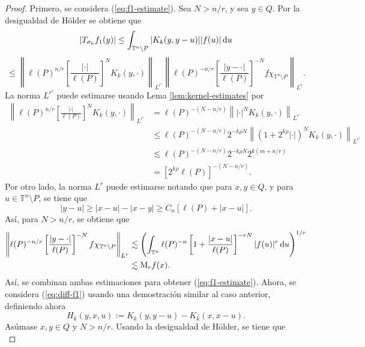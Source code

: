 \begin{proof}
	Primero, se considera (\ref{eq:f1-estimate}). Sea $N>n/r$, y sea $y\in Q$. Por la desigualdad de H\"older se obtiene que
	\begin{equation*}
		|T_{\sigma_k}f_1(y)| \leq \int_{\mathbb{T}^n\setminus P} |K_k(y, y-u)||f(u)|\mathop{}\!\mathrm{d} u 
	\end{equation*}
	\begin{equation*}
		\leq \left\| \ell(P)^{n/r} \left[ \frac{|\cdot|}{\ell(P)} \right]^N K_k(y, \cdot) 
		\right\|_{L^{r'}} \left\| \ell(P)^{-n/r} \left[ \frac{|y-\cdot|}{\ell(P)} \right]^{-N} f\chi_{\mathbb{T}^n\setminus P} 
		\right\|_{L^r}.
	\end{equation*}
	La norma $L^{r'}$ puede estimarse usando Lema \ref{lem:kernel-estimates} por 
	\begin{align*}
		\left\| \ell(P)^{n/r} \left[ \frac{|\cdot|}{\ell(P)} \right]^N K_k(y, \cdot) 
		\right\|_{L^{r'}} & = \ell(P)^{-(N-n/r)} \left\| |\cdot|^N K_k(y, \cdot)  \right\|_{L^{r'}} \\
		& \leq \ell(P)^{-(N-n/r)} 2^{-k\rho N} \left\| (1+2^{k\rho} |\cdot|)^N K_k(y, \cdot)  \right\|_{L^{r'}} \\
		& \lesssim \ell(P)^{-(N-n/r)} 2^{-k\rho N} 2^{k(m+n/r)}\\
		& = [2^{k\rho}\ell(P)]^{-(N-n/r)}.
	\end{align*}
	Por otro lado, la norma $L^r$ puede estimarse notando que para $x, y \in Q$, y para $u \in \mathbb{T}^n\setminus P$, se tiene que
	\begin{equation*}
		|y-u|\geq |x-u|-|x-y| \geq C_n[\ell(P)+|x-u|].
	\end{equation*}
	Así, para $N>n/r$, se obtiene que
\begin{align*}
	\left\| \ell(P)^{-n/r} \left[ \frac{|y-\cdot|}{\ell(P)} \right]^{-N}f \chi_{\mathbb{T}^n\setminus P}
	\right\|_{L^r}& \lesssim\left( \int_{\mathbb{T}^n} \ell(P)^{-n} \left[ 1+\frac{|x-u|}{\ell(P)}
	\right]^{-rN} |f(u)|^r \mathop{}\!\mathrm{d} u
	\right)^{1/r} \\
	& \lesssim\mathrm{M}_rf(x).
\end{align*}
Así, se combinan ambas estimaciones para obtener (\ref{eq:f1-estimate}). Ahora, se considera (\ref{eq:diff-f1}) usando una demostración similar al caso anterior, definiendo ahora 
\begin{equation*}
	H_k(y, x, u) := K_k(y, y-u) - K_k(x, x-u).
\end{equation*}
Asúmase $x, y \in Q$ y $N>n/r$. Usando la desigualdad de H\"older, se tiene que
\begin{equation*}

\end{equation*}
\end{proof}
